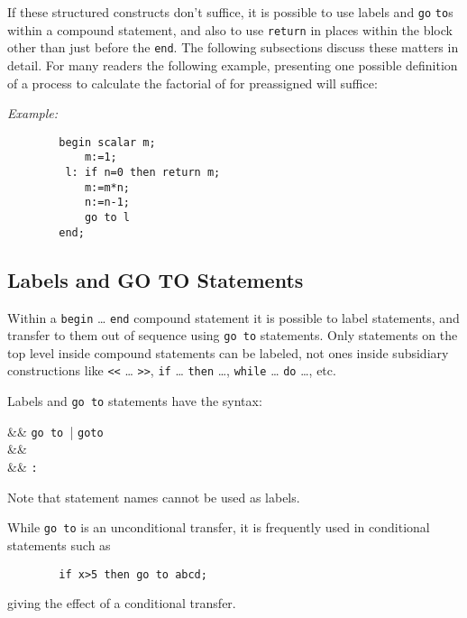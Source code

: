 If these structured constructs don't suffice, it is possible to use labels
 and \texttt{go} \texttt{to}s within a compound
statement, and also to use \texttt{return}
 in places within the block other than just before the
\texttt{end}.  The following subsections discuss these matters in detail.
For many readers the following example, presenting one possible definition
of a process to calculate the factorial of  for preassigned 
will suffice:

\textit{Example:}
\begin{verbatim}
        begin scalar m;
            m:=1;
         l: if n=0 then return m;
            m:=m*n;
            n:=n-1;
            go to l
        end;
\end{verbatim}

\subsection{Labels and GO TO Statements}
\hypertarget{command:GOTO}{}

Within a \texttt{begin} \ldots{}
\texttt{end} compound statement it is possible to label statements,
and transfer to them out of sequence using \texttt{go to} statements.
Only statements on the top level inside compound statements can be
labeled, not ones inside subsidiary constructions like
\texttt{<}\texttt{<} \ldots{} \texttt{>}\texttt{>}, \texttt{if}
\ldots{} \texttt{then} \ldots, \texttt{while} \ldots{} \texttt{do}
\ldots, etc.

Labels and \texttt{go to} statements have the syntax:
\begin{syntaxtable}
   &\BNFprod& \texttt{go to }|%
                                    \texttt{goto } \\
   &\BNFprod& \\
   &\BNFprod& \texttt{:}
\end{syntaxtable}
Note that statement names cannot be used as labels.

While \texttt{go to} is an unconditional transfer, it is frequently used
in conditional statements such as
\begin{verbatim}
        if x>5 then go to abcd;
\end{verbatim}
giving the effect of a conditional transfer.

